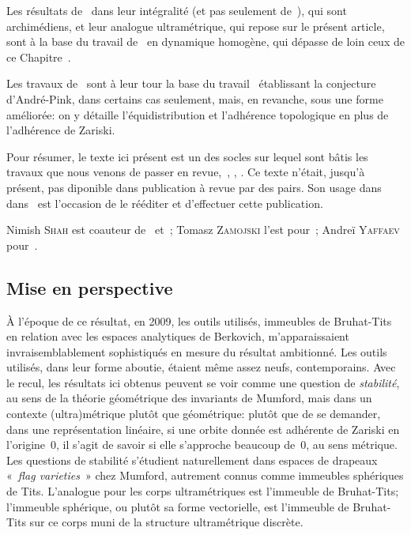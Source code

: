 \documentclass[french]{amsart}
\begin{document}
Les résultats de~\cite{RichardShah} dans leur intégralité (et pas seulement de~\cite{RS09}),
qui sont archimédiens, et leur analogue ultramétrique, qui repose sur le présent article, sont à la base du travail de~\cite{RichardZamojski} en dynamique homogène, qui dépasse de loin ceux de ce Chapitre~\uppercase\expandafter{\relax}.

Les travaux de~\cite{RichardZamojski} sont à leur tour la base du travail~\cite{RichardYaffaev} établissant la conjecture d'André-Pink, dans certains cas seulement, mais, en revanche, sous une forme améliorée: on y détaille l’équidistribution et l’adhérence topologique en plus de l’adhérence de Zariski.

Pour résumer, le texte ici présent est un des socles sur lequel sont bâtis les travaux que nous venons de passer en revue,~\cite{RichardShah}, \cite{RichardZamojski}, \cite{RichardYaffaev}. Ce texte n'était, jusqu'à présent, pas diponible dans publication à revue par des pairs. Son usage dans dans~\cite{RichardYaffaev} est l'occasion de le rééditer et d'effectuer cette publication.

Nimish \textsc{Shah} est coauteur de~\cite{RS09} et~\cite{RichardShah}; Tomasz \textsc{Zamojski} l'est pour~\cite{RichardZamojski}; Andreï \textsc{Yaffaev} pour~\cite{RichardYaffaev}.

\subsection*{Mise en perspective} À l'époque de ce résultat, en 2009, les outils utilisés, immeubles de Bruhat-Tits en relation avec les espaces analytiques de Berkovich, m'apparaissaient invraisemblablement sophistiqués en mesure
du résultat ambitionné. Les outils utilisés, dans leur forme aboutie, étaient même assez neufs, contemporains. Avec le recul, les résultats ici obtenus peuvent se voir comme une question de \emph{stabilité}, au sens de la théorie géométrique des invariants de Mumford, mais dans un contexte (ultra)métrique plutôt que géométrique: plutôt que de se demander, dans une représentation linéaire, si une orbite donnée est adhérente de Zariski en l'origine~$0$, il s'agit de savoir si elle s'approche beaucoup de~$0$, au sens métrique. Les questions de stabilité s'étudient naturellement dans espaces de drapeaux «~\emph{flag varieties}~» chez Mumford, autrement connus comme immeubles sphériques de Tits. L'analogue pour les corps ultramétriques est l'immeuble de Bruhat-Tits; l'immeuble sphérique, ou plutôt sa forme vectorielle, est l'immeuble de Bruhat-Tits sur ce corps muni de la structure ultramétrique discrète. 
\end{document}
